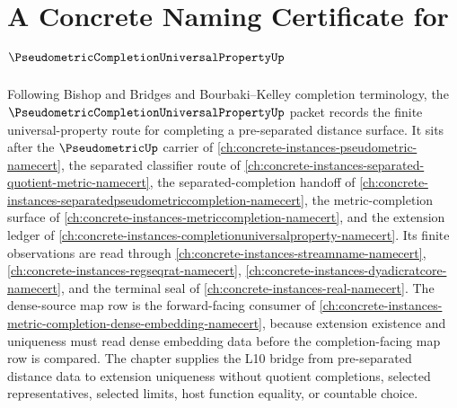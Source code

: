 \chapter{A Concrete Naming Certificate for $\PseudometricCompletionUniversalPropertyUp$}
\label{ch:concrete-instances-pseudometric-completion-universal-property-namecert}

Following Bishop and Bridges and Bourbaki--Kelley completion terminology, the $\PseudometricCompletionUniversalPropertyUp$ packet records the finite universal-property route for completing a pre-separated distance surface. It sits after the $\PseudometricUp$ carrier of \autoref{ch:concrete-instances-pseudometric-namecert}, the separated classifier route of \autoref{ch:concrete-instances-separated-quotient-metric-namecert}, the separated-completion handoff of \autoref{ch:concrete-instances-separatedpseudometriccompletion-namecert}, the metric-completion surface of \autoref{ch:concrete-instances-metriccompletion-namecert}, and the extension ledger of \autoref{ch:concrete-instances-completionuniversalproperty-namecert}. Its finite observations are read through \autoref{ch:concrete-instances-streamname-namecert}, \autoref{ch:concrete-instances-regseqrat-namecert}, \autoref{ch:concrete-instances-dyadicratcore-namecert}, and the terminal seal of \autoref{ch:concrete-instances-real-namecert}. The dense-source map row is the forward-facing consumer of \autoref{ch:concrete-instances-metric-completion-dense-embedding-namecert}, because extension existence and uniqueness must read dense embedding data before the completion-facing map row is compared. The chapter supplies the L10 bridge from pre-separated distance data to extension uniqueness without quotient completions, selected representatives, selected limits, host function equality, or countable choice.

